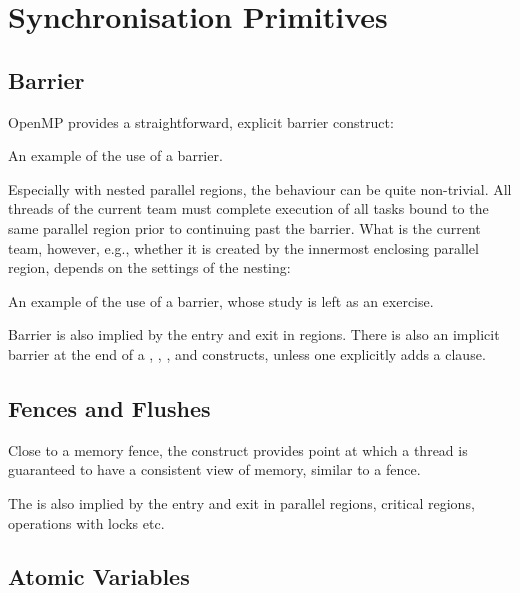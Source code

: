 \section{Synchronisation Primitives}

\subsection{Barrier}

OpenMP provides a straightforward, explicit barrier construct:

\raggedbottom
\begin{codebox}[]{\href{https://godbolt.org/z/qK53jYonK}{\ExternalLink}}
\footnotesize An example of the use of a barrier.
\tcblower
{}
\end{codebox}

Especially with nested parallel regions, the behaviour can be quite non-trivial.
All threads of the current team must complete execution of all tasks bound to the same parallel region prior to continuing past the barrier. What is the current team, however, e.g., whether it is created by the innermost enclosing parallel region,
depends on the settings of the nesting:

\raggedbottom
\begin{codebox}[]{\href{https://godbolt.org/z/eb7n975ea}{\ExternalLink}}
\footnotesize An example of the use of a barrier, whose study is left as an exercise.
\tcblower
{}
\end{codebox}

Barrier is also implied by the entry and exit in  regions.
There is also an implicit barrier at the end of a , , , and  constructs, unless one explicitly adds a  clause.

\subsection{Fences and Flushes}

Close to a memory fence, the  construct provides point at which a thread is guaranteed to
have a consistent view of memory, similar to a fence. 

The  is also implied by the entry and exit in parallel regions, critical regions, operations with locks etc. 

\subsection{Atomic Variables}

